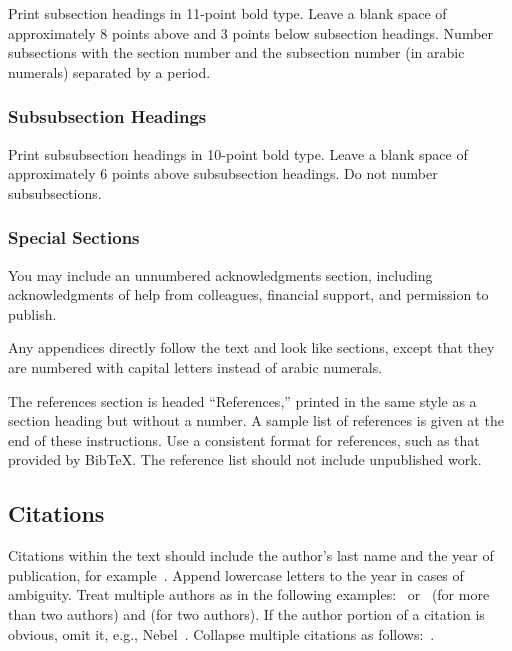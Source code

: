 \documentclass{article}
\begin{document}
Print subsection headings in 11-point bold type. Leave a blank space
of approximately 8 points above and 3 points below subsection
headings. Number subsections with the section number and the
subsection number (in arabic numerals) separated by a
period.

\subsubsection{Subsubsection Headings}

Print subsubsection headings in 10-point bold type. Leave a blank
space of approximately 6 points above subsubsection headings. Do not
number subsubsections.

\subsubsection{Special Sections}

You may include an unnumbered acknowledgments section, including
acknowledgments of help from colleagues, financial support, and
permission to publish.

Any appendices directly follow the text and look like sections, except
that they are numbered with capital letters instead of arabic
numerals.

The references section is headed ``References,'' printed in the same
style as a section heading but without a number. A sample list of
references is given at the end of these instructions. Use a consistent
format for references, such as that provided by Bib\TeX{}. The reference
list should not include unpublished work.

\subsection{Citations}

Citations within the text should include the author's last name and
the year of publication, for example~\cite{gottlob:nonmon}.  Append
lowercase letters to the year in cases of ambiguity.  Treat multiple
authors as in the following examples:~\cite{abelson-et-al:scheme}
or~\cite{bgf:Lixto} (for more than two authors) and
\cite{brachman-schmolze:kl-one} (for two authors).  If the author
portion of a citation is obvious, omit it, e.g.,
Nebel~.  Collapse multiple citations as
follows:~\cite{gls:hypertrees,levesque:functional-foundations}.
\nocite{abelson-et-al:scheme}
\nocite{bgf:Lixto}
\nocite{brachman-schmolze:kl-one}
\nocite{gottlob:nonmon}
\nocite{gls:hypertrees}
\nocite{levesque:functional-foundations}
\nocite{levesque:belief}
\nocite{nebel:jair-2000}
\end{document}
